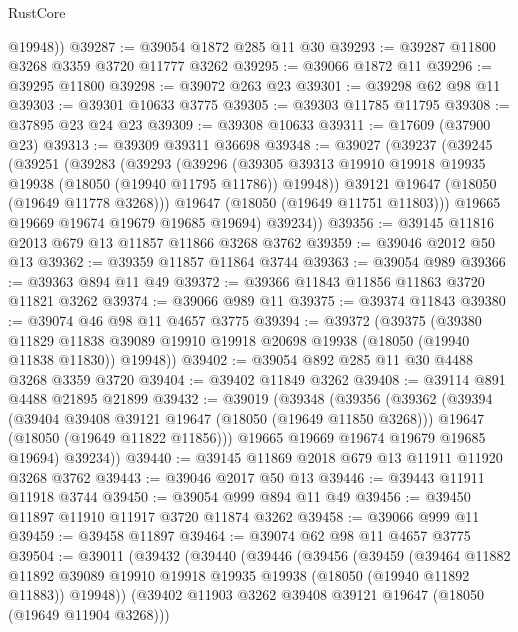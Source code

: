 \begin{lexlean}{RustCore}
\begin{coremodule}
        @19948))
@39287 := @39054 @1872 @285 @11 @30
@39293 := @39287 @11800 @3268 @3359 @3720 @11777 @3262
@39295 := @39066 @1872 @11
@39296 := @39295 @11800
@39298 := @39072 @263 @23
@39301 := @39298 @62 @98 @11
@39303 := @39301 @10633 @3775
@39305 := @39303 @11785 @11795
@39308 := @37895 @23 @24 @23
@39309 := @39308 @10633
@39311 := @17609 (@37900 @23)
@39313 := @39309 @39311 @36698
@39348 := @39027
    (@39237
      (@39245
        (@39251
          (@39283
            (@39293
              (@39296
                (@39305 @39313 @19910 @19918 @19935 @19938 (@18050 (@19940 @11795 @11786)) @19948))
              @39121
              @19647
              (@18050 (@19649 @11778 @3268)))
            @19647
            (@18050 (@19649 @11751 @11803)))
          @19665
          @19669
          @19674
          @19679
          @19685
          @19694)
        @39234))
@39356 := @39145 @11816 @2013 @679 @13 @11857 @11866 @3268 @3762
@39359 := @39046 @2012 @50 @13
@39362 := @39359 @11857 @11864 @3744
@39363 := @39054 @989
@39366 := @39363 @894 @11 @49
@39372 := @39366 @11843 @11856 @11863 @3720 @11821 @3262
@39374 := @39066 @989 @11
@39375 := @39374 @11843
@39380 := @39074 @46 @98 @11 @4657 @3775
@39394 := @39372
    (@39375
      (@39380
        @11829
        @11838
        @39089
        @19910
        @19918
        @20698
        @19938
        (@18050 (@19940 @11838 @11830))
        @19948))
@39402 := @39054 @892 @285 @11 @30 @4488 @3268 @3359 @3720
@39404 := @39402 @11849 @3262
@39408 := @39114 @891 @4488 @21895 @21899
@39432 := @39019
    (@39348
      (@39356
        (@39362
          (@39394
            (@39404 @39408 @39121 @19647 (@18050 (@19649 @11850 @3268)))
            @19647
            (@18050 (@19649 @11822 @11856)))
          @19665
          @19669
          @19674
          @19679
          @19685
          @19694)
        @39234))
@39440 := @39145 @11869 @2018 @679 @13 @11911 @11920 @3268 @3762
@39443 := @39046 @2017 @50 @13
@39446 := @39443 @11911 @11918 @3744
@39450 := @39054 @999 @894 @11 @49
@39456 := @39450 @11897 @11910 @11917 @3720 @11874 @3262
@39458 := @39066 @999 @11
@39459 := @39458 @11897
@39464 := @39074 @62 @98 @11 @4657 @3775
@39504 := @39011
    (@39432
      (@39440
        (@39446
          (@39456
            (@39459
              (@39464
                @11882
                @11892
                @39089
                @19910
                @19918
                @19935
                @19938
                (@18050 (@19940 @11892 @11883))
                @19948))
            (@39402 @11903 @3262 @39408 @39121 @19647 (@18050 (@19649 @11904 @3268)))

\end{coremodule}
\end{lexlean}

